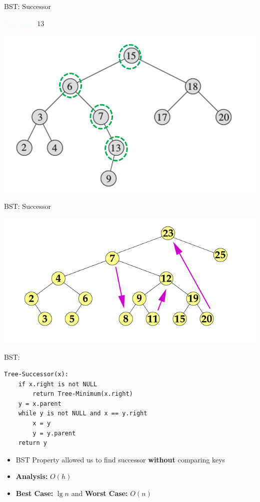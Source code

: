 \documentclass{beamer}
\newcommand{\tblue}[1]{{\Large {\textcolor{azure}{#1}}}}
\begin{document}
\begin{frame}{BST: Successor}

\tblue{Successor:} $13$
    \begin{center}
        \includegraphics[scale=0.5]{bstSuccessor4.png}
    \end{center}
\end{frame}


\begin{frame}{BST: Successor}

    \begin{center}
        \includegraphics[scale=0.5]{bstSuccessor8.png}
    \end{center}
\end{frame}


\begin{frame}[fragile]{BST: }
\begin{verbatim}
Tree-Successor(x):
    if x.right is not NULL
        return Tree-Minimum(x.right)
    y = x.parent
    while y is not NULL and x == y.right
        x = y
        y = y.parent
    return y
\end{verbatim}
    \begin{itemize}
        \item BST Property allowed us to find successor {\bf without} comparing keys
        \item {\bf Analysis:} $O(h)$ 
        \item {\bf Best Case:} $\lg n$ and {\bf Worst Case:} $O(n)$
    \end{itemize}
\end{frame}
\end{document}
